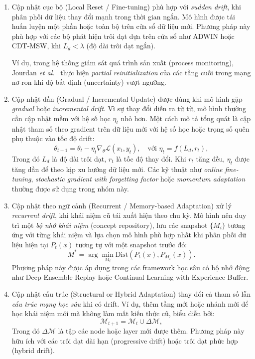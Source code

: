 \begin{enumerate}[label=(\alph*)]
	\item Cập nhật cục bộ (Local Reset / Fine-tuning) phù hợp với \emph{sudden drift}, khi phân phối dữ liệu thay đổi mạnh trong thời gian ngắn. Mô hình được tái huấn luyện một phần hoặc toàn bộ trên cửa sổ dữ liệu mới. Phương pháp này phù hợp với các bộ phát hiện trôi dạt dựa trên cửa sổ như ADWIN hoặc CDT-MSW, khi $L_d < \lambda$ (độ dài trôi dạt ngắn).

	      Ví dụ, trong hệ thống giám sát quá trình sản xuất (process monitoring), Jourdan \textit{et al.}~\cite{jourdan2023process} thực hiện \emph{partial reinitialization} của các tầng cuối trong mạng nơ-ron khi độ bất định (uncertainty) vượt ngưỡng.

	\item Cập nhật dần (Gradual / Incremental Update) được dùng khi mô hình gặp \emph{gradual} hoặc \emph{incremental drift}. Vì sự thay đổi diễn ra từ từ, mô hình thường cần cập nhật mềm với hệ số học $\eta_t$ nhỏ hơn. Một cách mô tả tổng quát là cập nhật tham số theo gradient trên dữ liệu mới với hệ số học hoặc trọng số quên phụ thuộc vào tốc độ drift:
	      \[
		      \theta_{t+1} = \theta_t - \eta_t \nabla_\theta \mathcal{L}(x_t, y_t),
		      \quad \text{với } \eta_t = f(L_d, r_t),
	      \]
	      Trong đó $L_d$ là độ dài trôi dạt, $r_t$ là tốc độ thay đổi. Khi $r_t$ tăng đều, $\eta_t$ được tăng dần để theo kịp xu hướng dữ liệu mới. Các kỹ thuật như \emph{online fine-tuning}, \emph{stochastic gradient with forgetting factor} hoặc \emph{momentum adaptation} thường được sử dụng trong nhóm này.

	\item Cập nhật theo ngữ cảnh (Recurrent / Memory-based Adaptation) xử lý \emph{recurrent drift}, khi khái niệm cũ tái xuất hiện theo chu kỳ. Mô hình nên duy trì một \emph{bộ nhớ khái niệm} (concept repository), lưu các snapshot $\{M_i\}$ tương ứng với từng khái niệm và lựa chọn mô hình phù hợp nhất khi phân phối dữ liệu hiện tại $P_t(x)$ tương tự với một snapshot trước đó:
	      \[
		      M^* = \arg\min_{M_i} \text{Dist}(P_t(x), P_{M_i}(x)).
	      \]
	      Phương pháp này được áp dụng trong các framework học sâu có bộ nhớ động như Deep Ensemble Replay hoặc Continual Learning with Experience Buffer.

	\item Cập nhật cấu trúc (Structural or Hybrid Adaptation) thay đổi cả tham số lẫn \emph{cấu trúc mạng học sâu} khi có drift.
	      Ví dụ, thêm tầng mới hoặc nhánh mới để học khái niệm mới mà không làm mất kiến thức cũ, biểu diễn bởi:
	      \[
		      \mathcal{M}_{t+1} = \mathcal{M}_t \cup \Delta \mathcal{M},
	      \]
	      Trong đó $\Delta \mathcal{M}$ là tập các node hoặc layer mới được thêm. Phương pháp này hữu ích với các trôi dạt dài hạn (progressive drift) hoặc trôi dạt phức hợp (hybrid drift).
\end{enumerate}


